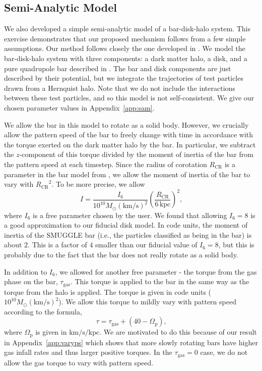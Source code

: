\documentclass[fleqn,usenatbib]{mnras}
\newcommand{\RCR}{\ensuremath{R_{\textrm{CR}}}}
\newcommand{\kms}{\ensuremath{\textrm{km}/\textrm{s}}}
\newcommand{\Msun}{\ensuremath{M_{\odot}}}
\begin{document}
\subsection{Semi-Analytic Model}
We also developed a simple semi-analytic model of a bar-disk-halo system. This
exercise demonstrates that our proposed mechanism follows from a few simple
assumptions. Our method follows closely the one developed in
\citet{2022MNRAS.513..768C}. We model the bar-disk-halo system with three
components: a dark matter \citet{1990ApJ...356..359H} halo, a
\citet{1975PASJ...27..533M} disk, and a pure quadrupole bar
described in \citet{2022MNRAS.513..768C}. The bar and disk components are just
described by their potential, but we integrate the trajectories of test
particles drawn from a Hernquist halo. Note that we do not include the
interactions between these test particles, and so this model is not
self-consistent. We give our chosen parameter values in Appendix~\ref{app:sam}.

We allow the bar in this model to rotate as a solid body. However, we crucially
allow the pattern speed of the bar to freely change with time in accordance with
the torque exerted on the dark matter halo by the bar. In particular, we
subtract the $z$-component of this torque divided by the moment of inertia of
the bar from the pattern speed at each timestep. Since the radius of corotation
\RCR{} is a parameter in the bar model from \citet{2022MNRAS.513..768C}, we
allow the moment of inertia of the bar to vary with ${\RCR}^2$. To be more
precise, we allow
\begin{equation}
I = \frac{I_6}{10^{10} \Msun (\kms)^2} \left( \frac{\RCR}{6\,\textrm{kpc}} \right)^2\textrm{,}
\end{equation}
where $I_6$ is a free parameter chosen by the user. We found that allowing
$I_6=8$ is a good approximation to our fiducial disk model. In code units, the
moment of inertia of the SMUGGLE bar (i.e., the particles classified as being in
the bar) is about $2$. This is a factor of $4$ smaller than our fiducial value
of $I_6=8$, but this is probably due to the fact that the bar does not really
rotate as a solid body.

In addition to $I_6$, we allowed for another free parameter - the torque from
the gas phase on the bar, $\tau_{\textrm{gas}}$. This torque is applied to the
bar in the same way as the torque from the halo is applied. The torque is given
in code units ($10^{10}\Msun \left(\kms\right)^2$). We allow this torque to
mildly vary with pattern speed according to the formula,
\begin{equation}
\tau = \tau_{\textrm{gas}} + (40 - \Omega_{\textrm{p}})\textrm{,}
\end{equation}
where $\Omega_{\textrm{p}}$ is given in $\kms/\textrm{kpc}$. We are motivated to
do this because of our result in Appendix~\ref{app:varyps} which shows that more
slowly rotating bars have higher gas infall rates and thus larger positive
torques. In the $\tau_{\textrm{gas}}=0$ case, we do not allow the gas torque to
vary with pattern speed.
\end{document}
